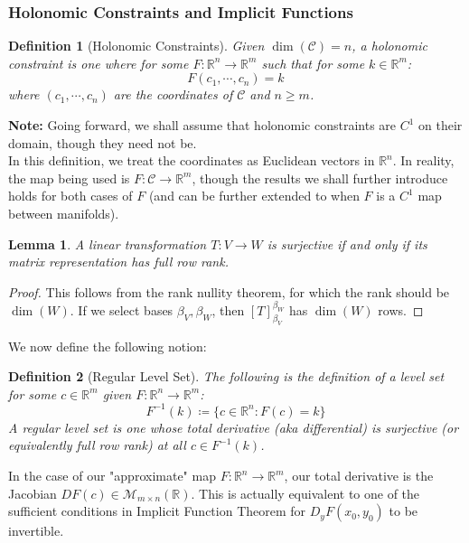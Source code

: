 \documentclass[10pt,letterpaper]{article} %
\newtheorem{lem}{Lemma}[section]
\newtheorem{defn}{Definition}[section]
\begin{document}
\subsubsection{Holonomic Constraints and Implicit Functions}
\begin{defn}[Holonomic Constraints]
Given $\dim(\mathcal{C}) = n$, a holonomic constraint is one where for some $F: \mathbb{R}^n \xrightarrow{} \mathbb{R}^m$ such that for some $k \in \mathbb{R}^m$:
\begin{equation*}
F(c_1, \cdots, c_n) = k
\end{equation*}
where $(c_1, \cdots, c_n)$ are the coordinates of $\mathcal{C}$ and $n \geqslant m$.
\end{defn}
\textbf{Note:} Going forward, we shall assume that holonomic constraints are $C^1$ on their domain, though they need not be.\\

In this definition, we treat the coordinates as Euclidean vectors in $\mathbb{R}^n$. In reality, the map being used is $F: \mathcal{C} \xrightarrow{} \mathbb{R}^m$, though the results we shall further introduce holds for both cases of $F$ (and can be further extended to when $F$ is a $C^1$ map between manifolds). 
\begin{lem}
A linear transformation $T: V \xrightarrow{} W$ is surjective if and only if its matrix representation has full row rank.
\end{lem}
\begin{proof}
This follows from the rank nullity theorem, for which the rank should be $\dim(W)$. If we select bases $\beta_V, \beta_W$, then $[T]_{\beta_V}^{\beta_W}$ has $\dim(W)$ rows.
\end{proof}
We now define the following notion:

\begin{defn}[Regular Level Set]
The following is the definition of a level set for some $c \in \mathbb{R}^m$ given $F: \mathbb{R}^n \xrightarrow{} \mathbb{R}^m$:
\begin{equation*}
F^{-1}(k) \coloneq \{c \in \mathbb{R}^n: F(c) = k\}
\end{equation*}
A regular level set is one whose total derivative (aka differential) is surjective (or equivalently full row rank) at all $c \in F^{-1}(k)$. 
\end{defn}
In the case of our "approximate" map $F: \mathbb{R}^n \xrightarrow{} \mathbb{R}^m$, our total derivative is the Jacobian $DF(c) \in \mathcal{M}_{m \times n}(\mathbb{R})$. This is actually equivalent to one of the sufficient conditions in Implicit Function Theorem for $D_yF(x_0, y_0)$ to be invertible.\\
\end{document}
